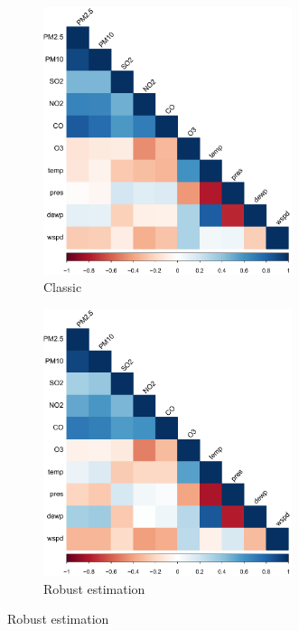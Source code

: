 \documentclass[a4paper, 12pt]{article}
\begin{document}
    \begin{figure}[h]
        \centering
        \begin{subfigure}{0.49\textwidth}
            \centering
            \includegraphics[width=0.8\textwidth]{resources/pdf/classic_correlation.pdf}
            \caption{Classic}
        \end{subfigure}
        \begin{subfigure}{0.49\textwidth}
            \centering
            \includegraphics[width=0.8\textwidth]{resources/pdf/robust_correlation.pdf}
            \caption{Robust estimation}
        \end{subfigure}
        \label{fig:robust_corrplot}
    \end{figure}
    
\end{document}
